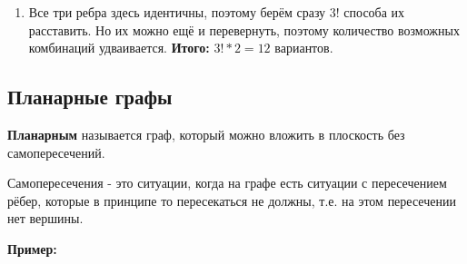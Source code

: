 \begin{enumerate}
    \item
\begin{claim*}
    Все три ребра здесь идентичны, поэтому берём сразу $3!$ способа их расставить. Но их можно ещё и перевернуть, поэтому количество возможных комбинаций удваивается. \textbf{Итого:} $3!*2=12$ вариантов.
\end{claim*}
\end{enumerate}
\newpage
\subsection{Планарные графы}
\begin{definition}
    \textbf{Планарным} называется граф, который можно вложить в плоскость без самопересечений.
\end{definition}
\begin{explanation*}
    Самопересечения - это ситуации, когда на графе есть ситуации с пересечением рёбер, которые в принципе то пересекаться не должны, т.е. на этом пересечении нет вершины.
\end{explanation*}

\textbf{Пример:}

